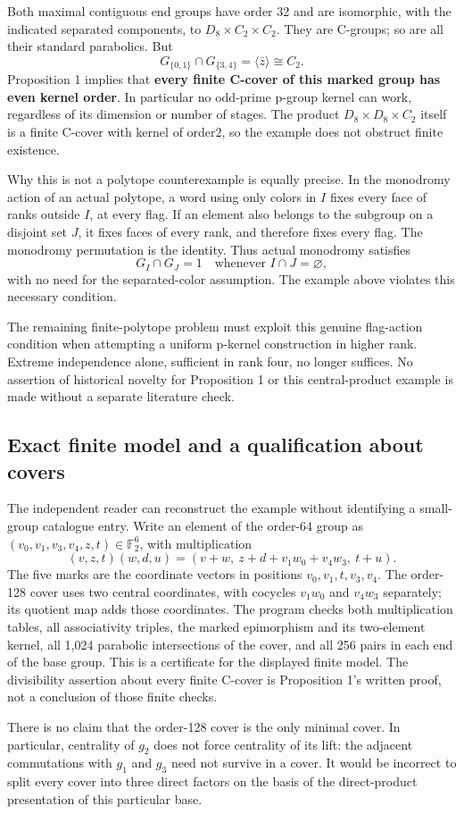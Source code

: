 \documentclass[
  11pt,
  a4paper,
]{article}
\renewcommand{\texttt}[1]{{\ttfamily\seqsplit{#1}}}
\begin{document}
Both maximal contiguous end groups have order 32 and are isomorphic,
with the indicated separated components, to \(D_8\times C_2\times C_2\).
They are C-groups; so are all their standard parabolics. But \[
 G_{\{0,1\}}\cap G_{\{3,4\}}=\langle\bar z\rangle\cong C_2.
\] Proposition 1 implies that \textbf{every finite C-cover of this
marked group has even kernel order}. In particular no odd-prime p-group
kernel can work, regardless of its dimension or number of stages. The
product \(D_8\times D_8\times C_2\) itself is a finite C-cover with
kernel of order2, so the example does not obstruct finite existence.

Why this is not a polytope counterexample is equally precise. In the
monodromy action of an actual polytope, a word using only colors in
\(I\) fixes every face of ranks outside \(I\), at every flag. If an
element also belongs to the subgroup on a disjoint set \(J\), it fixes
faces of every rank, and therefore fixes every flag. The monodromy
permutation is the identity. Thus actual monodromy satisfies \[
 G_I\cap G_J=1\quad\text{whenever }I\cap J=\varnothing,
\] with no need for the separated-color assumption. The example above
violates this necessary condition.

The remaining finite-polytope problem must exploit this genuine
flag-action condition when attempting a uniform p-kernel construction in
higher rank. Extreme independence alone, sufficient in rank four, no
longer suffices. No assertion of historical novelty for Proposition 1 or
this central-product example is made without a separate literature
check.

\subsection{Exact finite model and a qualification about
covers}\label{exact-finite-model-and-a-qualification-about-covers}

The independent reader can reconstruct the example without identifying a
small-group catalogue entry. Write an element of the order-64 group as
\((v_0,v_1,v_3,v_4,z,t)\in\mathbb F_2^6\), with multiplication \[
 (v,z,t)(w,d,u)=
 (v+w,\ z+d+v_1w_0+v_4w_3,\ t+u).
\] The five marks are the coordinate vectors in positions
\(v_0,v_1,t,v_3,v_4\). The order-128 cover uses two central coordinates,
with cocycles \(v_1w_0\) and \(v_4w_3\) separately; its quotient map
adds those coordinates. The program
\texttt{phase277\_obstruction\_check.py} checks both multiplication
tables, all associativity triples, the marked epimorphism and its
two-element kernel, all 1,024 parabolic intersections of the cover, and
all 256 pairs in each end of the base group. This is a certificate for
the displayed finite model. The divisibility assertion about every
finite C-cover is Proposition 1's written proof, not a conclusion of
those finite checks.

There is no claim that the order-128 cover is the only minimal cover. In
particular, centrality of \(g_2\) does not force centrality of its lift:
the adjacent commutations with \(g_1\) and \(g_3\) need not survive in a
cover. It would be incorrect to split every cover into three direct
factors on the basis of the direct-product presentation of this
particular base.
\end{document}
